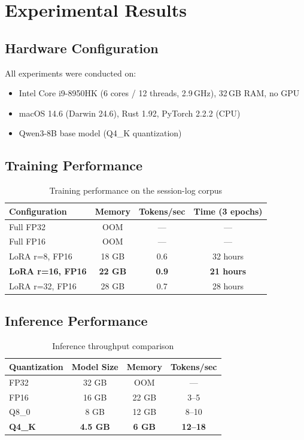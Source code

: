 \documentclass[11pt,a4paper]{article}
\theoremstyle{plain}
\theoremstyle{definition}
\begin{document}
\section{Experimental Results}
\label{sec:experiments}

\subsection{Hardware Configuration}

All experiments were conducted on:
\begin{itemize}
    \item Intel Core i9-8950HK (6 cores / 12 threads, 2.9\,GHz), 32\,GB RAM, no GPU
    \item macOS 14.6 (Darwin 24.6), Rust 1.92, PyTorch 2.2.2 (CPU)
    \item Qwen3-8B base model (Q4\_K quantization)
\end{itemize}

\subsection{Training Performance}

\begin{table}[h]
\centering
\caption{Training performance on the session-log corpus}
\begin{tabular}{lccc}
\toprule
\textbf{Configuration} & \textbf{Memory} & \textbf{Tokens/sec} & \textbf{Time (3 epochs)} \\
\midrule
Full FP32 & OOM & --- & --- \\
Full FP16 & OOM & --- & --- \\
LoRA r=8, FP16 & 18 GB & 0.6 & 32 hours \\
\textbf{LoRA r=16, FP16} & \textbf{22 GB} & \textbf{0.9} & \textbf{21 hours} \\
LoRA r=32, FP16 & 28 GB & 0.7 & 28 hours \\
\bottomrule
\end{tabular}
\label{tab:training}
\end{table}

\subsection{Inference Performance}

\begin{table}[h]
\centering
\caption{Inference throughput comparison}
\begin{tabular}{lccc}
\toprule
\textbf{Quantization} & \textbf{Model Size} & \textbf{Memory} & \textbf{Tokens/sec} \\
\midrule
FP32 & 32 GB & OOM & --- \\
FP16 & 16 GB & 22 GB & 3--5 \\
Q8\_0 & 8 GB & 12 GB & 8--10 \\
\textbf{Q4\_K} & \textbf{4.5 GB} & \textbf{6 GB} & \textbf{12--18} \\
\bottomrule
\end{tabular}
\label{tab:inference}
\end{table}
\end{document}
